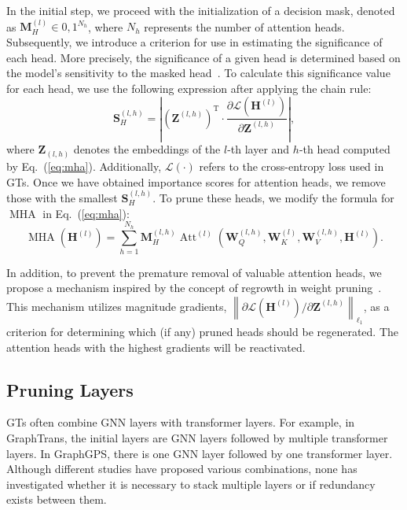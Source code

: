 \documentclass[letterpaper]{article} %
\begin{document}
In the initial step, we proceed with the initialization of a decision mask, denoted as $\mathbf{M}_{H}^{(l)} \in {0, 1}^{N_h}$, where $N_h$ represents the number of attention heads. Subsequently, we introduce a criterion for use in estimating the significance of each head. More precisely, the significance of a given head is determined based on the model's sensitivity to the masked head~\cite{head-sixteen,svite}. To calculate this significance value for each head, we use the following expression after applying the chain rule:
\begin{equation}
\mathbf{S}_H^{(l, h)}=\left|(\mathbf{Z}^{(l, h)})^{\mathrm{T}} \cdot \frac{\partial \mathcal{L}\left(\mathbf{H}^{(l)}\right)}{\partial \mathbf{Z}^{(l, h)}}\right|,
\end{equation}
where $\mathbf{Z}_{(l, h)}$ denotes the embeddings of the $l$-th layer and $h$-th head computed by Eq.~(\ref{eq:mha}). Additionally, $\mathcal {L}(\cdot)$ refers to the cross-entropy loss used in GTs. Once we have obtained importance scores for attention heads, we remove those with the smallest $\mathbf{S}_H^{(l, h)}$. To prune these heads, we modify the formula for $\operatorname{MHA}$ in Eq.~(\ref{eq:mha}):
\begin{equation*}
\operatorname{MHA}(\mathbf{H}^{(l)})=\sum_{h=1}^{N_h} \mathbf{M}_{H}^{(l,h)} \operatorname{Att}^{(l)}\left(\mathbf{W}_Q^{(l,h)}, \mathbf{W}_K^{(l)}, \mathbf{W}_V^{(l,h)}, \mathbf{H}^{(l)}\right).
\end{equation*} 

In addition, to prevent the premature removal of valuable attention heads, we propose a mechanism inspired by the concept of regrowth in weight pruning~\cite{cgp}. This mechanism utilizes magnitude gradients, $\left\|\partial \mathcal{L}\left(\mathbf{H}^{(l)}\right) /\partial \mathbf{Z}^{(l, h)}\right\|_{\ell_1}$, as a criterion for determining which (if any) pruned heads should be regenerated. The attention heads with the highest gradients will be reactivated.



\subsection{Pruning Layers}
\label{sec:pruning-layer}
GTs often combine GNN layers with transformer layers. For example, in GraphTrans, the initial layers are GNN layers followed by multiple transformer layers. In GraphGPS, there is one GNN layer followed by one transformer layer. Although different studies have proposed various combinations, none has investigated whether it is necessary to stack multiple layers or if redundancy exists between them.
\end{document}
